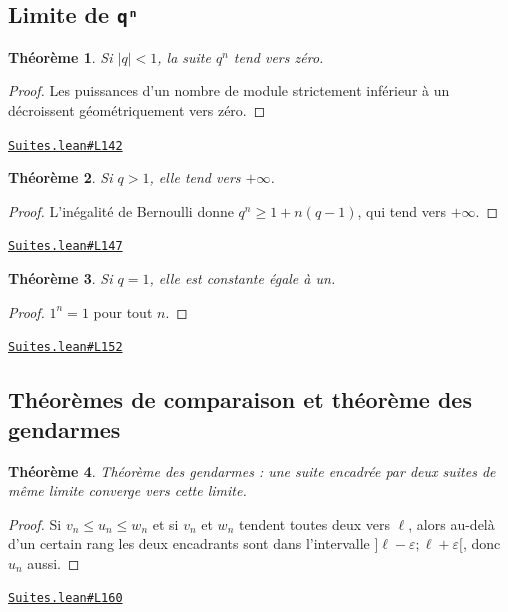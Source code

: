 \documentclass[11pt,a4paper]{article}
\theoremstyle{definition}
\theoremstyle{plain}
\newtheorem{theoreme}{Théorème}
\newcommand{\source}[2]{\par\smallskip\noindent\hfill{\footnotesize\href{#1}{\texttt{#2}}}\par\smallskip}
\begin{document}
\subsection{Limite de \texttt{qⁿ}}

\begin{theoreme}
Si $|q| < 1$, la suite $q^n$ tend vers zéro.
\end{theoreme}

\begin{proof}
Les puissances d'un nombre de module strictement inférieur à un décroissent
géométriquement vers zéro.
\end{proof}
\source{https://github.com/Commutator-IO/learn-lean/blob/main/cours/02-lycee/03-suites/Suites.lean\#L142}{Suites.lean\#L142}

\begin{theoreme}
Si $q > 1$, elle tend vers $+\infty$.
\end{theoreme}

\begin{proof}
L'inégalité de Bernoulli donne $q^n \ge 1 + n(q-1)$, qui tend vers $+\infty$.
\end{proof}
\source{https://github.com/Commutator-IO/learn-lean/blob/main/cours/02-lycee/03-suites/Suites.lean\#L147}{Suites.lean\#L147}

\begin{theoreme}
Si $q = 1$, elle est constante égale à un.
\end{theoreme}

\begin{proof}
$1^n = 1$ pour tout $n$.
\end{proof}
\source{https://github.com/Commutator-IO/learn-lean/blob/main/cours/02-lycee/03-suites/Suites.lean\#L152}{Suites.lean\#L152}

\subsection{Théorèmes de comparaison et théorème des gendarmes}

\begin{theoreme}
Théorème des gendarmes : une suite encadrée par deux suites de même limite converge
vers cette limite.
\end{theoreme}

\begin{proof}
Si $v_n \le u_n \le w_n$ et si $v_n$ et $w_n$ tendent toutes deux vers $\ell$, alors
au-delà d'un certain rang les deux encadrants sont dans l'intervalle
$]\ell - \varepsilon ; \ell + \varepsilon[$, donc $u_n$ aussi.
\end{proof}
\source{https://github.com/Commutator-IO/learn-lean/blob/main/cours/02-lycee/03-suites/Suites.lean\#L160}{Suites.lean\#L160}
\end{document}
